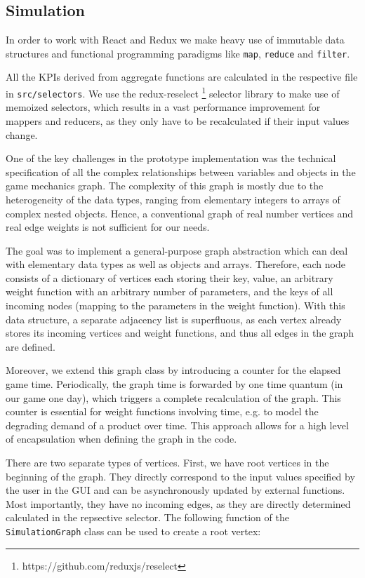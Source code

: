 \subsection{Simulation}

In order to work with React and Redux we make heavy use of immutable data structures and functional programming paradigms like \texttt{map}, \texttt{reduce} and \texttt{filter}.

All the KPIs derived from aggregate functions are calculated in the respective file in \texttt{src/selectors}. We use the redux-reselect \footnote{https://github.com/reduxjs/reselect} selector library to make use of memoized selectors, which results in a vast performance improvement for mappers and reducers, as they only have to be recalculated if their input values change.

One of the key challenges in the prototype implementation was the technical specification of all the complex relationships between variables and objects in the game mechanics graph. The complexity of this graph is mostly due to the heterogeneity of the data types, ranging from elementary integers to arrays of complex nested objects. 
Hence, a conventional graph of real number vertices and real edge weights is not sufficient for our needs.
 
 
The goal was to implement a general-purpose graph abstraction which can deal with elementary data types as well as objects and arrays.
Therefore, each node consists of a dictionary of vertices each storing their key, value, an arbitrary weight function with an arbitrary number of parameters, and the keys of all incoming nodes (mapping to the parameters in the weight function). With this data structure, a separate adjacency list is superfluous, as each vertex already stores its incoming vertices and weight functions, and thus all edges in the graph are defined.


Moreover, we extend this graph class by introducing a counter for the elapsed game time. Periodically, the graph time is forwarded by one time quantum (in our game one day), which triggers a complete recalculation of the graph. This counter is essential for weight functions involving time, e.g. to model the degrading demand of a product over time. This approach allows for a high level of encapsulation when defining the graph in the code. 

There are two separate types of vertices. First, we have root vertices in the beginning of the graph. They directly correspond to the input values specified by the user in the GUI and can be asynchronously updated by external functions. Most importantly, they have no incoming edges, as they are directly determined calculated in the repsective selector. The following function of the \texttt{SimulationGraph} class can be used to create a root vertex:

